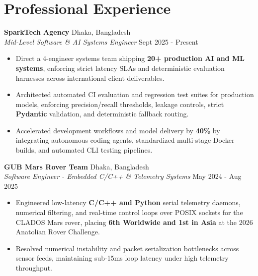 \documentclass[9.5pt,a4paper]{article}
\begin{document}
\section*{Professional Experience}
\noindent
\textbf{SparkTech Agency} \hfill Dhaka, Bangladesh\\
\textit{Mid-Level Software \& AI Systems Engineer} \hfill Sept 2025 - Present
\begin{itemize}
    \item Direct a 4-engineer systems team shipping \textbf{20+ production AI and ML systems}, enforcing strict latency SLAs and deterministic evaluation harnesses across international client deliverables.
    \item Architected automated CI evaluation and regression test suites for production models, enforcing precision/recall thresholds, leakage controls, strict \textbf{Pydantic} validation, and deterministic fallback routing.
    \item Accelerated development workflows and model delivery by \textbf{40\%} by integrating autonomous coding agents, standardized multi-stage Docker builds, and automated CLI testing pipelines.
\end{itemize}
\vspace{0.6pt}
\noindent
\textbf{GUB Mars Rover Team} \hfill Dhaka, Bangladesh\\
\textit{Software Engineer - Embedded C/C++ \& Telemetry Systems} \hfill May 2024 - Aug 2025
\begin{itemize}
    \item Engineered low-latency \textbf{C/C++ and Python} serial telemetry daemons, numerical filtering, and real-time control loops over POSIX sockets for the CLADOS Mars rover, placing \textbf{6th Worldwide and 1st in Asia} at the 2026 Anatolian Rover Challenge.
    \item Resolved numerical instability and packet serialization bottlenecks across sensor feeds, maintaining sub-15ms loop latency under high telemetry throughput.
\end{itemize}
\vspace{0.6pt}
\end{document}

